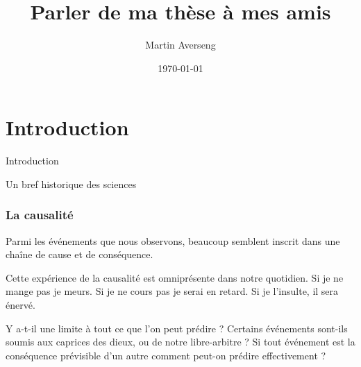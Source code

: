 \documentclass[11pt]{beamer}
\author{Martin Averseng}
\title{\textbf{Parler de ma thèse à mes amis}\\}
\date{\today}
\begin{document}
	\maketitle

	\section{Introduction}
	
	\begin{frame}
		\centering
		\begin{large}
			Introduction
		\end{large}
		\vspace{10pt}
		
		\begin{huge}
			Un bref historique des sciences
		\end{huge}	
	\end{frame}
	
	\begin{frame}
		\frametitle{La causalité}
		Parmi les événements que nous observons, beaucoup semblent inscrit dans une chaîne de cause et de conséquence.  
		
		Cette expérience de la causalité est omniprésente dans notre quotidien. Si je ne mange pas je meurs. Si je ne cours pas je serai en retard. Si je l'insulte, il sera énervé. 
		
		Y a-t-il une limite à tout ce que l'on peut prédire ? Certains événements sont-ils soumis aux caprices des dieux, ou de notre libre-arbitre ?  Si tout événement est la conséquence prévisible d'un autre comment peut-on prédire effectivement ? 
	\end{frame}
	
\end{document}
